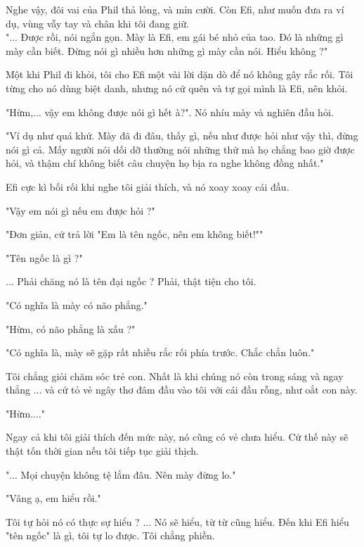  Nghe vậy, đôi vai của Phil thả lỏng, và mỉn cười. Còn Efi, như muốn đưa ra ví dụ, vùng vẫy tay và chân khi tôi đang giữ.\\
 
 
 
 "... Được rồi, nói ngắn gọn. Mày là Efi, em gái bé nhỏ của tao. Đó là những gì mày cần biết. Đừng nói gì nhiều hơn những gì mày cần nói. Hiểu không ?"
 
 Một khi Phil đi khỏi, tôi cho Efi một vài lời dặn dò để nó không gây rắc rối. Tôi từng cho nó dùng biệt danh, nhưng nó cứ quên và tự gọi mình là Efi, nên khỏi.
 
 "Hừm,... vậy em không được nói gì hết à?". Nó nhíu mày và nghiên đầu hỏi.
 
 "Ví dụ như quá khứ. Mày đã đi đâu, thấy gì, nếu như được hỏi như vậy thì, đừng nói gì cả. Mấy người nói dối dỡ thường nói những thứ mà họ chẳng bao giờ được hỏi, và thậm chí không biết câu chuyện họ bịa ra nghe không đồng nhất."
 
 Efi cực kì bối rối khi nghe tôi giải thích, và nó xoay xoay cái đầu.
 
 "Vậy em nói gì nếu em được hỏi ?"
 
 "Đơn giản, cứ trả lời "Em là tên ngốc, nên em không biết!""
 
 "Tên ngốc là gì ?"
 
 ... Phải chăng nó là tên đại ngốc ? Phải, thật tiện cho tôi.
 
 "Có nghĩa là mày có não phẳng."
 
 "Hừm, có não phẳng là xấu ?"
 
 "Có nghĩa là, mày sẽ gặp rất nhiều rắc rối phía trước. Chắc chắn luôn."

Tôi chẳng giỏi chăm sóc trẻ con. Nhất là khi chúng nó còn trong sáng và ngay thẳng ... và cứ tỏ vẻ ngây thơ đâm đầu vào tôi với cái đầu rỗng, như oắt con này.
 
 "Hừm...."
 
 Ngay cả khi tôi giải thích đến mức này, nó cũng có vẻ chưa hiểu. Cứ thế này sẽ thật tốn thời gian nếu tôi tiếp tục giải thịch.
 
 "... Mọi chuyện không tệ lắm đâu. Nên mày đừng lo."
 
 "Vâng ạ, em hiểu rồi."
 
 Tôi tự hỏi nó có thực sự hiểu ? ... Nó sẽ hiểu, từ từ cũng hiểu. Đến khi Efi hiểu "tên ngốc" là gì, tôi tự lo được. Tôi chẳng phiền.
 
